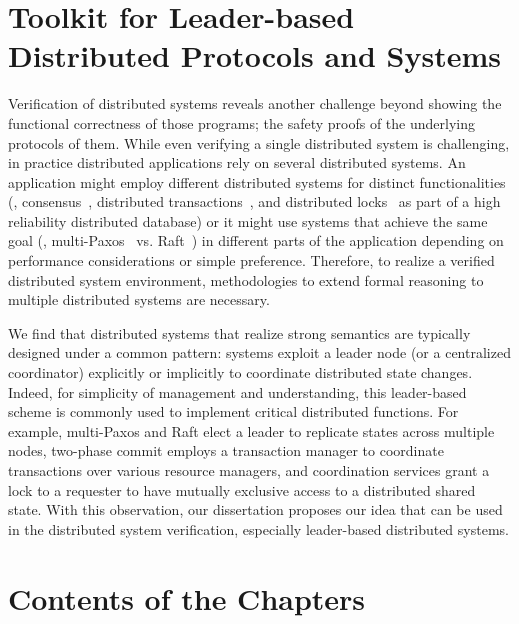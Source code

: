 %
%
%

\section{Toolkit for Leader-based Distributed Protocols and Systems}
\label{chapter:introduction:sec:toolkit-for-leader-based-distributed-protocols-and-systems}


Verification of distributed systems reveals another challenge beyond showing the functional correctness of those programs; the safety proofs of the underlying protocols of them. 
While even verifying a single distributed system is challenging, in practice
distributed applications rely on several distributed systems. An application
might employ different distributed systems for distinct functionalities (\eg,
consensus~\cite{vivaladifference}, distributed transactions~\cite{gray:2006},
and distributed locks~\cite{chubby, zookeeper} as part of a high reliability
distributed database) or it might use systems that achieve the same goal (\eg,
multi-Paxos~\cite{paxosmadesimple, rvrpaxos} vs. Raft~\cite{raft}) in different
parts of the application depending on performance considerations or simple
preference. Therefore, to realize a verified distributed system environment,
methodologies to extend formal reasoning to multiple distributed systems are
necessary.

We find that distributed systems that realize strong semantics are typically
designed under a common pattern: systems exploit a leader node
(or a centralized coordinator) explicitly or implicitly to coordinate
distributed state changes. Indeed, for simplicity of management and understanding, this leader-based scheme is commonly used to implement critical distributed functions. For example, multi-Paxos and Raft elect a leader to replicate states
across multiple nodes, two-phase commit employs a transaction manager to
coordinate transactions over various resource managers, and coordination
services grant a lock to a requester to have mutually exclusive access to a
distributed shared state.
With this observation, our dissertation proposes our idea that can be used in the distributed system verification,
especially leader-based distributed systems.

\section{Contents of the Chapters}
\label{chapter:introduction:sec:contents-of-the-chapters}

